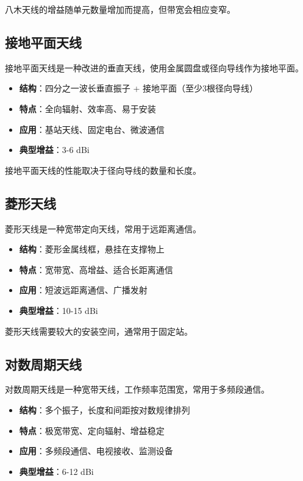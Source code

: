 八木天线的增益随单元数量增加而提高，但带宽会相应变窄。

\subsection{接地平面天线}
\label{sec:ground_plane_antenna}

接地平面天线是一种改进的垂直天线，使用金属圆盘或径向导线作为接地平面。

\begin{itemize}
    \item \textbf{结构}：四分之一波长垂直振子 + 接地平面（至少3根径向导线）
    \item \textbf{特点}：全向辐射、效率高、易于安装
    \item \textbf{应用}：基站天线、固定电台、微波通信
    \item \textbf{典型增益}：3-6 dBi
\end{itemize}

接地平面天线的性能取决于径向导线的数量和长度。

\subsection{菱形天线}
\label{sec:diamond_antenna}

菱形天线是一种宽带定向天线，常用于远距离通信。

\begin{itemize}
    \item \textbf{结构}：菱形金属线框，悬挂在支撑物上
    \item \textbf{特点}：宽带宽、高增益、适合长距离通信
    \item \textbf{应用}：短波远距离通信、广播发射
    \item \textbf{典型增益}：10-15 dBi
\end{itemize}

菱形天线需要较大的安装空间，通常用于固定站。

\subsection{对数周期天线}
\label{sec:log_periodic_antenna}

对数周期天线是一种宽带天线，工作频率范围宽，常用于多频段通信。

\begin{itemize}
    \item \textbf{结构}：多个振子，长度和间距按对数规律排列
    \item \textbf{特点}：极宽带宽、定向辐射、增益稳定
    \item \textbf{应用}：多频段通信、电视接收、监测设备
    \item \textbf{典型增益}：6-12 dBi
\end{itemize}

